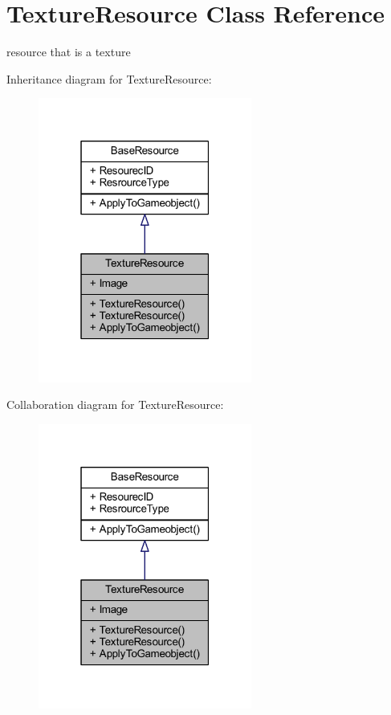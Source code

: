 \hypertarget{class_texture_resource}{}\section{Texture\+Resource Class Reference}
\label{class_texture_resource}


resource that is a texture  




Inheritance diagram for Texture\+Resource\+:
\nopagebreak
\begin{figure}[H]
\begin{center}
\leavevmode
\includegraphics[width=199pt]{class_texture_resource__inherit__graph}
\end{center}
\end{figure}


Collaboration diagram for Texture\+Resource\+:
\nopagebreak
\begin{figure}[H]
\begin{center}
\leavevmode
\includegraphics[width=199pt]{class_texture_resource__coll__graph}
\end{center}
\end{figure}
